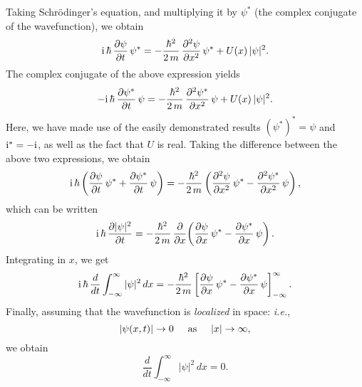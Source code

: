Taking Schr\"{o}dinger's equation, and multiplying it by $\psi^\ast$ (the complex conjugate of the wavefunction), we
obtain
\begin{equation}
{\rm i}\,\hbar\,\frac{\partial\psi}{\partial t}\,\psi^\ast = -\frac{\hbar^2}{2\,m}\,\frac{\partial^2\psi}{\partial x^2}\,\psi^\ast + U(x)\,|\psi|^2.
\end{equation}
The complex conjugate of the above expression yields
\begin{equation}
-{\rm i}\,\hbar\,\frac{\partial\psi^\ast}{\partial t}\,\psi = -\frac{\hbar^2}{2\,m}\,\frac{\partial^2\psi^\ast}{\partial x^2}\,\psi+ U(x)\,|\psi|^2.
\end{equation}
Here, we have made use  of the easily demonstrated results $(\psi^\ast)^\ast=\psi$ and ${\rm i}^\ast=-{\rm i}$, as well as the fact that $U$ is real. 
Taking the difference between the above two expressions, we obtain
\begin{equation}
{\rm i}\,\hbar\left(\frac{\partial\psi}{\partial t}\,\psi^\ast + \frac{\partial\psi^\ast}{\partial t}\,\psi\right)
= -\frac{\hbar^2}{2\,m}\left(\frac{\partial^2\psi}{\partial x^2}\,\psi^\ast - \frac{\partial^2\psi^\ast}{\partial x^2}\,\psi\right),
\end{equation}
which can be written
\begin{equation}
{\rm i}\,\hbar\,\frac{\partial |\psi|^2}{\partial t} = -\frac{\hbar^2}{2\,m}\,\frac{\partial}{\partial x}\!\left(
\frac{\partial\psi}{\partial x}\,\psi^\ast - \frac{\partial\psi^\ast}{\partial x}\,\psi\right).
\end{equation}
Integrating in $x$, we get
\begin{equation}
{\rm i}\,\hbar\,\frac{d}{dt}\int_{-\infty}^\infty |\psi|^2\,dx= -\frac{\hbar^2}{2\,m}\left[
\frac{\partial\psi}{\partial x}\,\psi^\ast - \frac{\partial\psi^\ast}{\partial x}\,\psi\right]_{-\infty}^\infty.
\end{equation}
Finally, assuming that the wavefunction is {\em localized}\/ in space: {\em i.e.}, 
\begin{equation}
|\psi(x,t)|\rightarrow 0 \mbox{\hspace{0.5cm}as\hspace{0.5cm}} |x|\rightarrow\infty,
\end{equation}
we obtain
\begin{equation}
\frac{d}{dt}\int_{-\infty}^\infty |\psi|^2\,dx=0.
\end{equation}

